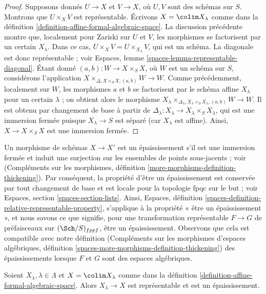 \begin{proof}
Supposons donnés $U \to X$ et $V \to X$, où $U, V$ sont des schémas sur $S$.
Montrons que $U \times_X V$ est représentable. Écrivons $X = \colim X_\lambda$
comme dans la définition \ref{definition-affine-formal-algebraic-space}.
La discussion précédente montre que, localement pour Zariski sur $U$ et $V$, les morphismes
se factorisent par un certain $X_\lambda$. Dans ce cas,
$U \times_X V = U \times_{X_\lambda} V$, qui est un schéma.
La diagonale est donc représentable ; voir
Espaces, lemme \ref{spaces-lemma-representable-diagonal}.
Étant donné $(a, b) : W \to X \times_S X$, où $W$ est un schéma sur $S$,
considérons l'application $X \times_{\Delta, X \times_S X, (a, b)} W \to W$.
Comme précédemment, localement sur $W$, les morphismes $a$ et $b$ se factorisent par
le schéma affine $X_\lambda$ pour un certain $\lambda$ ; on obtient alors
le morphisme
$X_\lambda
\times_{\Delta_\lambda, X_\lambda \times_S X_\lambda, (a, b)} W \to W$.
Il est obtenu par changement de base à partir de
$\Delta_\lambda : X_\lambda \to X_\lambda \times_S X_\lambda$,
qui est une immersion fermée puisque $X_\lambda \to S$ est séparé
(car $X_\lambda$ est affine).
Ainsi, $X \to X \times_S X$ est une immersion fermée.
\end{proof}

\noindent
Un morphisme de schémas $X \to X'$ est un épaississement s'il est une immersion fermée
et induit une surjection sur les ensembles de points sous-jacents ; voir
(Compléments sur les morphismes, définition
\ref{more-morphisms-definition-thickening}).
Par conséquent, la propriété d'être un épaississement est conservée par tout
changement de base et est locale pour la topologie fpqc sur le but ; voir
Espaces, section \ref{spaces-section-lists}.
Ainsi, Espaces, définition \ref{spaces-definition-relative-representable-property},
s'applique à la propriété « être un épaississement », et nous savons ce que signifie, pour une
transformation représentable $F \to G$ de
préfaisceaux sur $(\Sch/S)_{fppf}$, être un épaississement.
Observons que cela est compatible avec notre définition
(Compléments sur les morphismes d'espaces algébriques, définition
\ref{spaces-more-morphisms-definition-thickening})
des épaississements lorsque $F$ et $G$ sont des espaces algébriques.

\begin{lemma}
\label{lemma-covering-by-thickenings}
Soient $X_\lambda, \lambda \in \Lambda$ et $X = \colim X_\lambda$
comme dans la définition \ref{definition-affine-formal-algebraic-space}.
Alors $X_\lambda \to X$ est représentable et est un épaississement.
\end{lemma}

